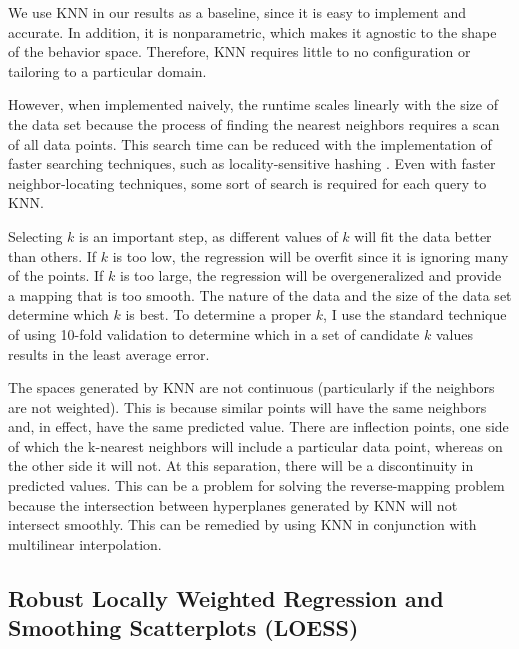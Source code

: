 We use KNN in our results as a baseline, since it is easy to implement and accurate.
In addition, it is nonparametric, which makes it agnostic to the shape of the behavior space.
Therefore, KNN requires little to no configuration or tailoring to a particular domain.

However, when implemented naively, the runtime scales linearly with the size of the data set because the process of finding the nearest neighbors requires a scan of all data points.
This search time can be reduced with the implementation of faster searching techniques, such as locality-sensitive hashing \cite{gionis1999similarity}.
Even with faster neighbor-locating techniques, some sort of search is required for each query to KNN.

Selecting $k$ is an important step, as different values of $k$ will fit the data better than others.
If $k$ is too low, the regression will be overfit since it is ignoring many of the points.
If $k$ is too large, the regression will be overgeneralized and provide a mapping that is too smooth.
The nature of the data and the size of the data set determine which $k$ is best.
To determine a proper $k$, I use the standard technique of using 10-fold validation to determine which in a set of candidate $k$ values results in the least average error.

The spaces generated by KNN are not continuous (particularly if the neighbors are not weighted).
This is because similar points will have the same neighbors and, in effect, have the same predicted value.
There are inflection points, one side of which the k-nearest neighbors will include a particular data point, whereas on the other side it will not.
At this separation, there will be a discontinuity in predicted values.
This can be a problem for solving the reverse-mapping problem because the intersection between hyperplanes generated by KNN will not intersect smoothly.
This can be remedied by using KNN in conjunction with multilinear interpolation.
      
\subsection{Robust Locally Weighted Regression and Smoothing Scatterplots (LOESS)}


